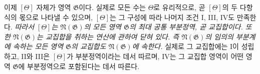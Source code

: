
이제 $[\Theta]$ 자체가 영역 $\mathfrak G$이다. 실제로 모든 수는 $\Theta$로 유리적으로, 곧 $[\Theta]$의 두 다항식의 몫으로 나타낼 수 있으며, $[\Theta]$는 그 구성에 따라 나머지 조건 I, III, IV도 만족한다. \emph{따라서 $[\Theta]$는 $\mathfrak N(\mathfrak G)$의 모든 영역 $\mathfrak G$의 최대 공통 부분정역, 곧 교집합이다. 또한 $\mathfrak N(\mathfrak G)$는 교집합을 취하는 연산에 관하여 닫혀 있다. 즉 $\mathfrak N(\mathfrak G)$의 임의의 부분계에 속하는 모든 영역 $\mathfrak G$의 교집합도 $\mathfrak N(\mathfrak G)$에 속한다.} 실제로 그 교집합에는 I이 성립하고, II와 III은 $[\Theta]$가 부분정역이라는 데서 따르며, IV는 그 교집합 영역이 어떤 영역 $\mathfrak G$에 부분정역으로 포함된다는 데서 따른다.
